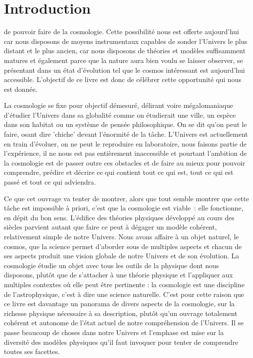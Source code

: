 \chapter*{Introduction}
 de pouvoir faire de la cosmologie. Cette possibilité nous est offerte aujourd'hui car nous disposons de moyens instrumentaux capables de sonder l'Univers le plus distant et le plus ancien, car nous disposons de théories et modèles suffisamment matures et également parce que la nature aura bien voulu se laisser observer, se présentant dans un état d'évolution tel que le cosmos intéressant est aujourd'hui accessible. 
L'objectif de ce livre est donc de célébrer cette opportunité qui nous est donnée.

La cosmologie se fixe pour objectif démesuré, délirant voire mégalomaniaque d'étudier l'Univers dans sa globalité comme on étudierait une ville, un espèce dans son habitat ou un système de pensée philosophique. On se dit qu'on peut le faire, osant dire 'chiche' devant l'énormité de la tâche. L'Univers  est actuellement en train d'évoluer, on ne peut le reproduire en laboratoire, nous faisons partie de l'expérience, il ne nous est pas entièrement inaccessible et pourtant l'ambition de la cosmologie est de passer outre ces obstacles et de faire au mieux pour pouvoir comprendre, prédire et décrire ce qui contient tout ce qui est, tout ce qui est passé et tout ce qui adviendra.

Ce que cet ouvrage va tenter de montrer, alors que tout semble montrer que cette tâche est impossible à priori, c'est que la cosmologie est viable~: elle fonctionne, en dépit du bon sens. L'édifice des théories physiques développé au cours des siècles parvient autant que faire ce peut à dégager un modèle cohérent, relativement simple de notre Univers. Nous avons affaire à un objet naturel, le cosmos, que la science permet d'aborder sous de multiples aspects et chacun de ses aspects produit une vision globale de notre Univers et de son évolution. La cosmologie étudie un objet avec tous les outils de la physique dont nous disposons, plutôt que de s'attacher à une théorie physique et l'appliquer aux multiples contextes où elle peut être pertinente : la cosmologie est une discipline de l'astrophysique, c'est à dire une science naturelle. C'est pour cette raison que ce livre est davantage un panorama de divers aspects de la cosmologie, sur la richesse physique nécessaire à sa description, plutôt qu'un ouvrage totalement cohérent et autonome de l'état actuel de notre compréhension de l'Univers. Il se passe beaucoup de choses dans notre Univers et l'emphase est mise sur la diversité des modèles physiques qu'il faut invoquer pour tenter de comprendre toutes ses facettes.

